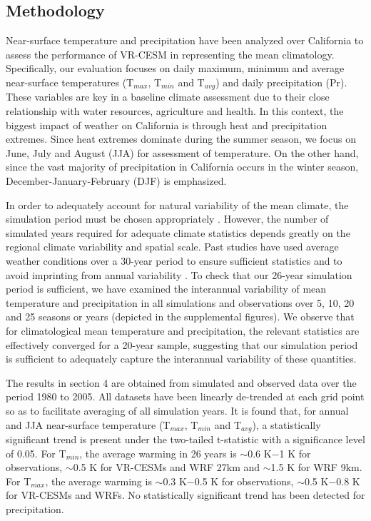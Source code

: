 \subsection{Methodology}

Near-surface temperature and precipitation have been analyzed over California to assess the performance of VR-CESM in representing the mean climatology. Specifically, our evaluation focuses on daily maximum, minimum and average near-surface temperatures (T$_{max}$, T$_{min}$ and T$_{avg}$) and daily precipitation (Pr). These variables are key in a baseline climate assessment due to their close relationship with water resources, agriculture and health. In this context, the biggest impact of weather on California is through heat and precipitation extremes. Since heat extremes dominate during the summer season, we focus on June, July and August (JJA) for assessment of temperature. On the other hand, since the vast majority of precipitation in California occurs in the winter season, December-January-February (DJF) is emphasized.  

In order to adequately account for natural variability of the mean climate, the simulation period must be chosen appropriately \cite{solomon2007climate}. However, the number of simulated years required for adequate climate statistics depends greatly on the regional climate variability and spatial scale. Past studies have used average weather conditions over a 30-year period to ensure sufficient statistics and to avoid imprinting from annual variability \cite{dinse2009climate}. To check that our 26-year simulation period is sufficient, we have examined the interannual variability of mean temperature and precipitation in all simulations and observations over 5, 10, 20 and 25 seasons or years (depicted in the supplemental figures). We observe that for climatological mean temperature and precipitation, the relevant statistics are effectively converged for a 20-year sample, suggesting that our simulation period is sufficient to adequately capture the interannual variability of these quantities. 


The results in section 4 are obtained from simulated and observed data over the period 1980 to 2005.  All datasets have been linearly de-trended at each grid point so as to facilitate averaging of all simulation years. It is found that, for annual and JJA near-surface temperature (T$_{max}$, T$_{min}$ and T$_{avg}$), a statistically significant trend is present under the two-tailed t-statistic with a significance level of 0.05. For T$_{min}$, the average warming in 26 years is $\sim$0.6 K$-$1 K for observations, $\sim$0.5 K for VR-CESMs and WRF 27km and $\sim$1.5 K for WRF 9km. For T$_{max}$, the average warming is $\sim$0.3 K$-$0.5 K for observations, $\sim$0.5 K$-$0.8 K for VR-CESMs and WRFs. No statistically significant trend has been detected for precipitation.

